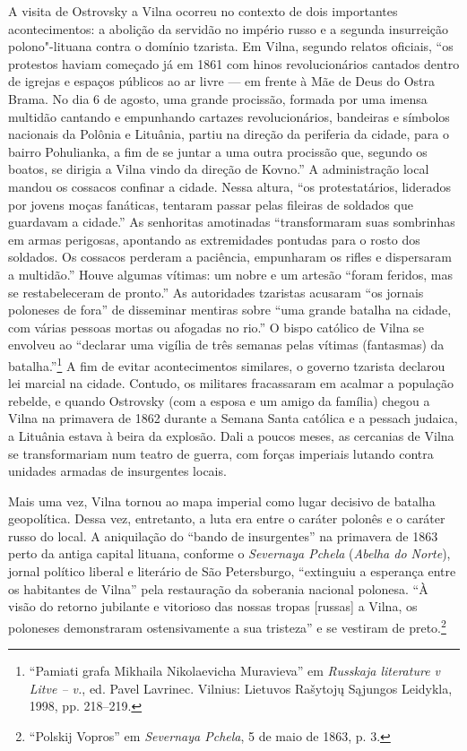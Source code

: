 %

A visita de Ostrovsky a Vilna ocorreu no contexto de dois importantes
acontecimentos: a abolição da servidão no império russo e a segunda
insurreição polono"-lituana contra o domínio tzarista. Em Vilna, segundo
relatos oficiais, ``os protestos haviam começado já em 1861 com hinos
revolucionários cantados dentro de igrejas e espaços públicos ao ar
livre --- em frente à Mãe de Deus do Ostra Brama. No dia 6 de agosto, uma
grande procissão, formada por uma imensa multidão cantando e empunhando
cartazes revolucionários, bandeiras e símbolos nacionais da Polônia e
Lituânia, partiu na direção da periferia da cidade, para o bairro
Pohulianka, a fim de se juntar a uma outra procissão que, segundo os
boatos, se dirigia a Vilna vindo da direção de Kovno.'' A administração
local mandou os cossacos confinar a cidade. Nessa altura, ``os
protestatários, liderados por jovens moças fanáticas, tentaram passar
pelas fileiras de soldados que guardavam a cidade.'' As senhoritas
amotinadas ``transformaram suas sombrinhas em armas perigosas, apontando
as extremidades pontudas para o rosto dos soldados. Os cossacos perderam
a paciência, empunharam os rifles e dispersaram a multidão.'' Houve
algumas vítimas: um nobre e um artesão ``foram feridos, mas se
restabeleceram de pronto.'' As autoridades tzaristas acusaram ``os
jornais poloneses de fora'' de disseminar mentiras sobre ``uma grande
batalha na cidade, com várias pessoas mortas ou afogadas no rio.'' O
bispo católico de Vilna se envolveu ao ``declarar uma vigília de três
semanas pelas vítimas (fantasmas) da batalha.''\footnote{``Pamiati grafa
  Mikhaila Nikolaevicha Muravieva'' em \emph{Russkaja literature v Litve
  -- v.}, ed. Pavel Lavrinec. Vilnius: Lietuvos Rašytojų Sąjungos
  Leidykla, 1998, pp. 218--219.} A fim de evitar acontecimentos
similares, o governo tzarista declarou lei marcial na cidade. Contudo,
os militares fracassaram em acalmar a população rebelde, e quando
Ostrovsky (com a esposa e um amigo da família) chegou a Vilna na
primavera de 1862 durante a Semana Santa católica e a pessach judaica, a
Lituânia estava à beira da explosão. Dali a poucos meses, as cercanias
de Vilna se transformariam num teatro de guerra, com forças imperiais
lutando contra unidades armadas de insurgentes locais.

Mais uma vez, Vilna tornou ao mapa imperial como lugar decisivo de
batalha geopolítica. Dessa vez, entretanto, a luta era entre o caráter
polonês e o caráter russo do local. A aniquilação do ``bando de
insurgentes'' na primavera de 1863 perto da antiga capital lituana,
conforme o \emph{Severnaya Pchela} (\emph{Abelha do Norte}), jornal
político liberal e literário de São Petersburgo, ``extinguiu a esperança
entre os habitantes de Vilna'' pela restauração da soberania nacional
polonesa. ``À visão do retorno jubilante e vitorioso das nossas tropas
{[}russas{]} a Vilna, os poloneses demonstraram ostensivamente a sua
tristeza'' e se vestiram de preto.\footnote{``Polskij Vopros'' em
  \emph{Severnaya Pchela}, 5 de maio de 1863, p. 3.}

